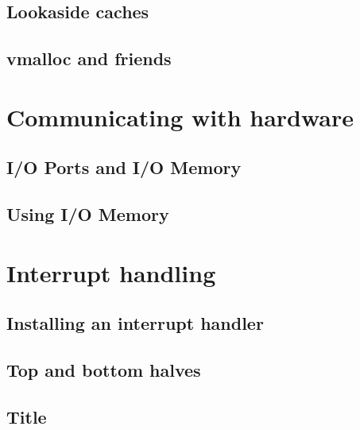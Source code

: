 \documentclass{beamer}
\begin{document}
\subsection{Lookaside caches}

\subsection{vmalloc and friends}

\section{Communicating with hardware}
\subsection{I/O Ports and I/O Memory}

\subsection{Using I/O Memory}

\section{Interrupt handling}
\subsection{Installing an interrupt handler}

\subsection{Top and bottom halves}

\subsection{Title}

\end{document}
